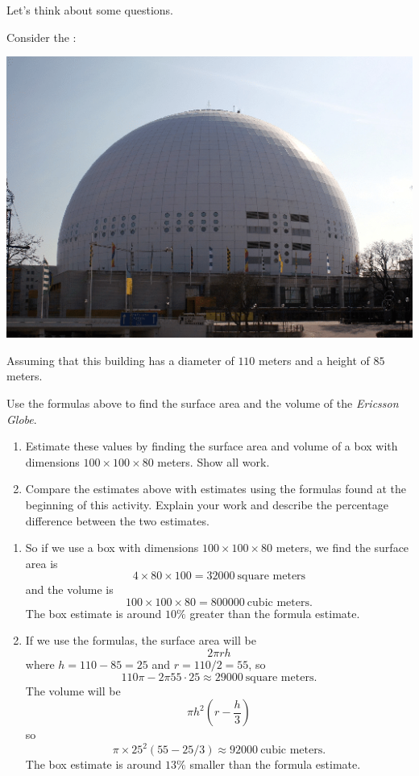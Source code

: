 \documentclass[handout,nooutcomes,noauthor,hints]{ximera}
\begin{document}
Let's think about some questions. 


\mynewpage




\begin{question} \label{FG1:1}
  Consider the :
   \begin{center}
    \includegraphics[width=.4\textwidth]{dome.png} %
   \end{center}
   Assuming that this building has a diameter of $110$ meters and a
   height of $85$ meters.
   
   Use the formulas above to find the surface area
   and the volume of the \textit{Ericsson Globe}.
\begin{enumerate}
\item Estimate these values by finding the surface area and volume of
  a box with dimensions $100\times 100 \times 80$ meters. Show all work.
\item Compare the estimates above with estimates using the formulas
  found at the beginning of this activity. Explain your work and
  describe the percentage difference between the two estimates.
\end{enumerate}
\begin{freeResponse}
  \begin{enumerate}
  \item So if we use a box with dimensions $100\times 100 \times 80$ meters,
    we find the surface area is
    \[
    4\times 80 \times 100 = 32000~\text{square meters}
    \]
    and the volume is
    \[
    100\times 100 \times 80 = 800000~\text{cubic meters.}
    \]
    The box estimate is around $10\%$ greater than the formula
    estimate.
  \item If we use the formulas, the surface area will be
    \[
    2\pi rh
    \]
    where $h= 110-85 = 25$ and $r= 110/2 = 55$, so
    \[
    110 \pi - 2\pi 55\cdot 25 \approx  29000~\text{square meters}.
    \]
    The volume will be
    \[
    \pi h^2 \left( r- \frac{h}{3}\right)
    \]
    so
    \[
    \pi \times 25^2 (55 - 25/3) \approx 92000 ~\text{cubic meters.}
    \]
    The box estimate is around $13\%$ smaller than the formula
    estimate.
  \end{enumerate}
\end{freeResponse}
   \end{question}
\mynewpage
\end{document}
